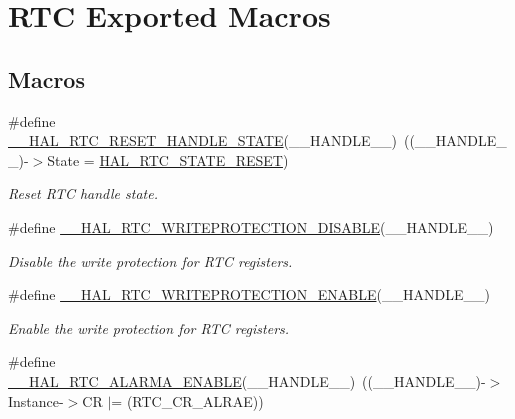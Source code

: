 \hypertarget{group___r_t_c___exported___macros}{}\section{R\+TC Exported Macros}
\label{group___r_t_c___exported___macros}
\subsection*{Macros}
\begin{DoxyCompactItemize}
\item 
\#define \hyperlink{group___r_t_c___exported___macros_gaf20c09cfca416d79777562ccf7c994a2}{\+\_\+\+\_\+\+H\+A\+L\+\_\+\+R\+T\+C\+\_\+\+R\+E\+S\+E\+T\+\_\+\+H\+A\+N\+D\+L\+E\+\_\+\+S\+T\+A\+TE}(\+\_\+\+\_\+\+H\+A\+N\+D\+L\+E\+\_\+\+\_\+)~((\+\_\+\+\_\+\+H\+A\+N\+D\+L\+E\+\_\+\+\_\+)-\/$>$State = \hyperlink{group___r_t_c___exported___types_gga1e2460a2d13c4efc7a2a1ab2a1ebd32ba69cd05758f5129525749b65bee6f939f}{H\+A\+L\+\_\+\+R\+T\+C\+\_\+\+S\+T\+A\+T\+E\+\_\+\+R\+E\+S\+ET})
\begin{DoxyCompactList}\small\item\em Reset R\+TC handle state. \end{DoxyCompactList}\item 
\#define \hyperlink{group___r_t_c___exported___macros_gae150645fb78c1d175b9e0f88fc3f4ad4}{\+\_\+\+\_\+\+H\+A\+L\+\_\+\+R\+T\+C\+\_\+\+W\+R\+I\+T\+E\+P\+R\+O\+T\+E\+C\+T\+I\+O\+N\+\_\+\+D\+I\+S\+A\+B\+LE}(\+\_\+\+\_\+\+H\+A\+N\+D\+L\+E\+\_\+\+\_\+)
\begin{DoxyCompactList}\small\item\em Disable the write protection for R\+TC registers. \end{DoxyCompactList}\item 
\#define \hyperlink{group___r_t_c___exported___macros_ga9eaed4a4db3b3232c1ca5d8ffa6ff4d8}{\+\_\+\+\_\+\+H\+A\+L\+\_\+\+R\+T\+C\+\_\+\+W\+R\+I\+T\+E\+P\+R\+O\+T\+E\+C\+T\+I\+O\+N\+\_\+\+E\+N\+A\+B\+LE}(\+\_\+\+\_\+\+H\+A\+N\+D\+L\+E\+\_\+\+\_\+)
\begin{DoxyCompactList}\small\item\em Enable the write protection for R\+TC registers. \end{DoxyCompactList}\item 
\#define \hyperlink{group___r_t_c___exported___macros_ga88aa460d4d8a7a65acf4b3dbcd0a2813}{\+\_\+\+\_\+\+H\+A\+L\+\_\+\+R\+T\+C\+\_\+\+A\+L\+A\+R\+M\+A\+\_\+\+E\+N\+A\+B\+LE}(\+\_\+\+\_\+\+H\+A\+N\+D\+L\+E\+\_\+\+\_\+)~((\+\_\+\+\_\+\+H\+A\+N\+D\+L\+E\+\_\+\+\_\+)-\/$>$Instance-\/$>$CR $\vert$= (R\+T\+C\+\_\+\+C\+R\+\_\+\+A\+L\+R\+AE))

\end{DoxyCompactItemize}
